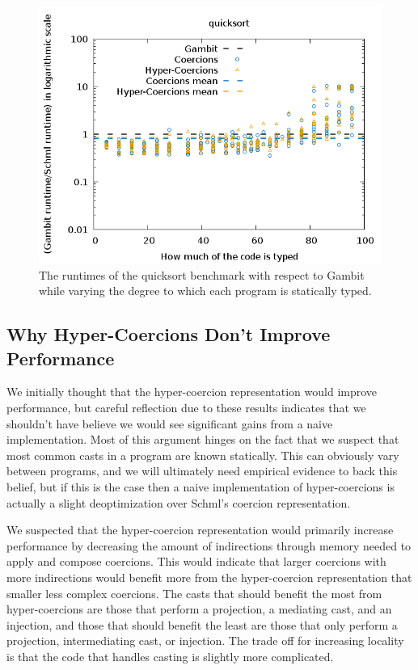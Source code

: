 \documentclass[acmtog, authorversion, acmlarge]{acmart}
\begin{document}
\begin{figure}
  \includegraphics[scale=.5]{quicksort_Proxied.png}
  \caption{The runtimes of the quicksort benchmark with respect
    to Gambit while varying the degree to which each program
    is statically typed.}
  \label{fig:grd_quicksort}
\end{figure}

\subsection{Why Hyper-Coercions Don't Improve Performance}
We initially thought that the hyper-coercion representation
would improve performance, but careful reflection due to
these results indicates that we shouldn't have believe
we would see significant gains from a naive implementation.
Most of this argument hinges on the fact that we suspect
that most common casts in a program are known statically.
This can obviously vary between programs, and we will
ultimately need empirical evidence to back this belief,
but if this is the case then a naive implementation of
hyper-coercions is actually a slight deoptimization
over Schml's coercion representation. 

We suspected that the hyper-coercion representation
would primarily increase performance by decreasing
the amount of indirections through memory needed to
apply and compose coercions. This would indicate that
larger coercions with more indirections would benefit
more from the hyper-coercion representation that smaller
less complex coercions. 
The casts that should benefit the most from hyper-coercions
are those that perform a projection, a mediating cast,
and an injection, and those that should benefit the
least are those that only perform a projection, intermediating
cast, or injection.
The trade off for increasing locality is that the code
that handles casting is slightly more complicated.
\end{document}
